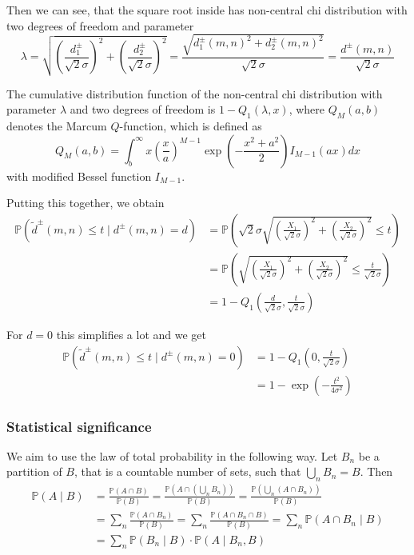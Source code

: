 \documentclass[a4paper,12pt]{article}
\theoremstyle{plain}
\theoremstyle{definition}
\theoremstyle{remark}
\begin{document}
Then we can see, that the square root inside has non-central chi distribution with two degrees of freedom and parameter
\begin{equation*}
	\lambda = \sqrt{\left( \frac{d_1^\pm}{\sqrt{2} \sigma} \right)^2 + \left( \frac{d_2^\pm}{\sqrt{2} \sigma} \right)^2} = \frac{\sqrt{d_1^\pm(m, n)^2 + d_2^\pm(m, n)^2}}{\sqrt{2} \sigma} = \frac{d^\pm(m, n)}{\sqrt{2} \sigma}
\end{equation*}

The cumulative distribution function of the non-central chi distribution with parameter $\lambda$ and two degrees of freedom is $1 - Q_1(\lambda, x)$, where $Q_M(a, b)$ denotes the Marcum $Q$-function, which is defined as
\begin{equation*}
	Q_M(a, b) = \int_b^\infty x \left( \frac{x}{a} \right)^{M-1} \exp \left( - \frac{x^2 + a^2}{2} \right) I_{M-1}(ax) dx
\end{equation*}
with modified Bessel function $I_{M-1}$.

Putting this together, we obtain
\begin{align*}
	\mathbb{P}(\tilde{d}^\pm(m, n) \leq t \mid d^\pm(m, n) = d) &= \mathbb{P}\left( \sqrt{2} \sigma \sqrt{\left( \frac{X_1}{\sqrt{2} \sigma} \right)^2 + \left( \frac{X_2}{\sqrt{2} \sigma} \right)^2} \leq t \right) \\
	&= \mathbb{P}\left( \sqrt{\left( \frac{X_1}{\sqrt{2} \sigma} \right)^2 + \left( \frac{X_2}{\sqrt{2} \sigma} \right)^2} \leq \frac{t}{\sqrt{2} \sigma} \right) \\
	&= 1 - Q_1 \left( \frac{d}{\sqrt{2} \sigma}, \frac{t}{\sqrt{2} \sigma} \right)
\end{align*}

For $d = 0$ this simplifies a lot and we get
\begin{align*}
	\mathbb{P}(\tilde{d}^\pm(m, n) \leq t \mid d^\pm(m, n) = 0) &= 1 - Q_1 \left( 0, \frac{t}{\sqrt{2} \sigma} \right) \\
	&= 1 - \exp \left( - \frac{t^2}{4 \sigma^2} \right)
\end{align*}

\subsubsection{Statistical significance}

We aim to use the law of total probability in the following way. Let $B_n$ be a partition of $B$, that is a countable number of sets, such that $\bigcup_n B_n = B$. Then
\begin{align*}
	\mathbb{P}(A \mid B) &= \frac{\mathbb{P}(A \cap B)}{\mathbb{P}(B)} = \frac{\mathbb{P}(A \cap (\bigcup_n B_n ))}{\mathbb{P}(B)} = \frac{\mathbb{P}(\bigcup_n (A \cap B_n))}{\mathbb{P}(B)} \\
	&= \sum_n \frac{\mathbb{P}(A \cap B_n)}{\mathbb{P}(B)} = \sum_n \frac{\mathbb{P}(A \cap B_n \cap B)}{\mathbb{P}(B)} = \sum_n \mathbb{P}(A \cap B_n \mid B) \\
	&= \sum_n \mathbb{P}(B_n \mid B) \cdot \mathbb{P}(A \mid B_n, B)
\end{align*}
\end{document}
